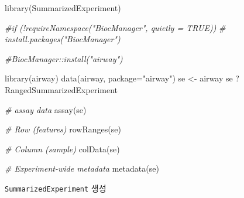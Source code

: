 \documentclass[
]{book}
\newenvironment{Shaded}{\begin{snugshade}}{\end{snugshade}}
\newcommand{\AttributeTok}[1]{\textcolor[rgb]{0.77,0.63,0.00}{#1}}
\newcommand{\CommentTok}[1]{\textcolor[rgb]{0.56,0.35,0.01}{\textit{#1}}}
\newcommand{\FunctionTok}[1]{\textcolor[rgb]{0.00,0.00,0.00}{#1}}
\newcommand{\NormalTok}[1]{#1}
\newcommand{\OtherTok}[1]{\textcolor[rgb]{0.56,0.35,0.01}{#1}}
\newcommand{\StringTok}[1]{\textcolor[rgb]{0.31,0.60,0.02}{#1}}
\begin{document}
\begin{Shaded}
\begin{Highlighting}[]
\FunctionTok{library}\NormalTok{(SummarizedExperiment)}

\CommentTok{\#if (!requireNamespace("BiocManager", quietly = TRUE))}
\CommentTok{\#    install.packages("BiocManager")}

\CommentTok{\#BiocManager::install("airway")}

\FunctionTok{library}\NormalTok{(airway)}
\FunctionTok{data}\NormalTok{(airway, }\AttributeTok{package=}\StringTok{"airway"}\NormalTok{)}
\NormalTok{se }\OtherTok{\textless{}{-}}\NormalTok{ airway}
\NormalTok{se}
\NormalTok{?RangedSummarizedExperiment }

\CommentTok{\# assay data}
\FunctionTok{assay}\NormalTok{(se)}

\CommentTok{\# Row (features)}
\FunctionTok{rowRanges}\NormalTok{(se)}

\CommentTok{\# Column (sample)}
\FunctionTok{colData}\NormalTok{(se)}

\CommentTok{\# Experiment{-}wide metadata}
\FunctionTok{metadata}\NormalTok{(se)}
\end{Highlighting}
\end{Shaded}

\texttt{SummarizedExperiment} 생성
\end{document}

